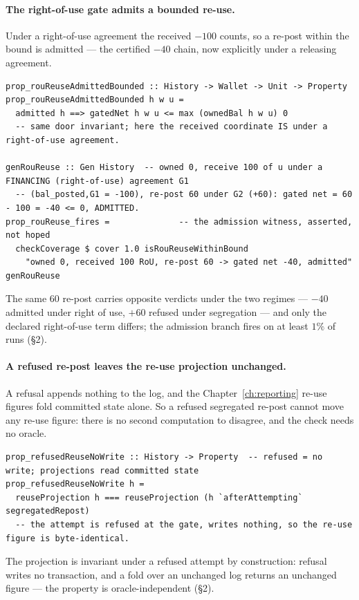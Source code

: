 \documentclass[11pt,a4paper]{article}
\begin{document}
\paragraph{The right-of-use gate admits a bounded re-use.}
Under a right-of-use agreement the received $-100$ counts, so a re-post within the bound
is admitted --- the certified $-40$ chain, now explicitly under a releasing agreement.

\begin{lstlisting}
prop_rouReuseAdmittedBounded :: History -> Wallet -> Unit -> Property
prop_rouReuseAdmittedBounded h w u =
  admitted h ==> gatedNet h w u <= max (ownedBal h w u) 0
  -- same door invariant; here the received coordinate IS under a right-of-use agreement.

genRouReuse :: Gen History  -- owned 0, receive 100 of u under a FINANCING (right-of-use) agreement G1
  -- (bal_posted,G1 = -100), re-post 60 under G2 (+60): gated net = 60 - 100 = -40 <= 0, ADMITTED.
prop_rouReuse_fires =              -- the admission witness, asserted, not hoped
  checkCoverage $ cover 1.0 isRouReuseWithinBound
    "owned 0, received 100 RoU, re-post 60 -> gated net -40, admitted" genRouReuse
\end{lstlisting}

The same $60$ re-post carries opposite verdicts under the two regimes --- $-40$ admitted
under right of use, $+60$ refused under segregation --- and only the declared right-of-use
term differs; the admission branch fires on at least $1\%$ of runs (\S 2).

\paragraph{A refused re-post leaves the re-use projection unchanged.}
A refusal appends nothing to the log, and the Chapter~\ref{ch:reporting} re-use figures
fold committed state alone. So a refused segregated re-post cannot move any re-use figure:
there is no second computation to disagree, and the check needs no oracle.

\begin{lstlisting}
prop_refusedReuseNoWrite :: History -> Property  -- refused = no write; projections read committed state
prop_refusedReuseNoWrite h =
  reuseProjection h === reuseProjection (h `afterAttempting` segregatedRepost)
  -- the attempt is refused at the gate, writes nothing, so the re-use figure is byte-identical.
\end{lstlisting}

The projection is invariant under a refused attempt by construction: refusal writes no
transaction, and a fold over an unchanged log returns an unchanged figure --- the property
is oracle-independent (\S 2).
\end{document}
